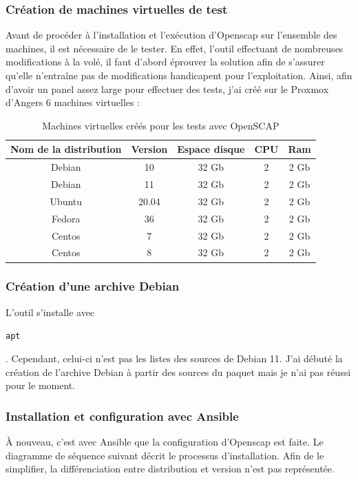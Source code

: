 \documentclass[12pt]{article}
\begin{document}
\subsubsection{Création de machines virtuelles de test}
Avant de procéder à l'installation et l'exécution d'Openscap sur l'ensemble des machines, il est nécessaire de le tester. En effet, l'outil effectuant de nombreuses modifications à la volé, il faut d'abord éprouver la solution afin de s'assurer qu'elle n'entraîne pas de modifications handicapent pour l'exploitation.
Ainsi, afin d'avoir un panel assez large pour effectuer des tests, j'ai créé sur le \gls{Proxmox} d'Angers 6 machines virtuelles :
\begin{table}[ht!]
    \begin{center}
        \begin{tabular}{| c | c | c | c | c |}
        \hline
        Nom de la distribution & Version & Espace disque & CPU & Ram 
        \tabularnewline

        \hline
        Debian & 10 & 32 Gb & 2 & 2 Gb
        \tabularnewline

        \hline
        Debian & 11 & 32 Gb & 2 & 2 Gb
        \tabularnewline

        \hline
        Ubuntu & 20.04 & 32 Gb & 2 & 2 Gb
        \tabularnewline

        \hline
        Fedora & 36 & 32 Gb & 2 & 2 Gb
        \tabularnewline

        \hline
        Centos & 7 & 32 Gb & 2 & 2 Gb
        \tabularnewline

        \hline
        Centos & 8 & 32 Gb & 2 & 2 Gb
        \tabularnewline
        \hline
        \end{tabular}
    \end{center}
    \caption{Machines virtuelles créés pour les tests avec \gls{OpenSCAP}}
\end{table}

\subsubsection{Création d'une archive Debian}
L'outil s'installe avec \begin{code} \texttt{\gls{apt}}\end{code}.
Cependant, celui-ci n'est pas les listes des sources de Debian 11. 
J'ai débuté la création de l'archive Debian à partir des sources du paquet mais je n'ai pas réussi pour le moment.

\subsubsection{Installation et configuration avec \gls{Ansible}}
À nouveau, c'est avec \gls{Ansible} que la configuration d'Openscap est faite. 
Le diagramme de séquence suivant décrit le processus d'installation. 
Afin de le simplifier, la différenciation entre distribution et version n'est pas représentée.
\end{document}

